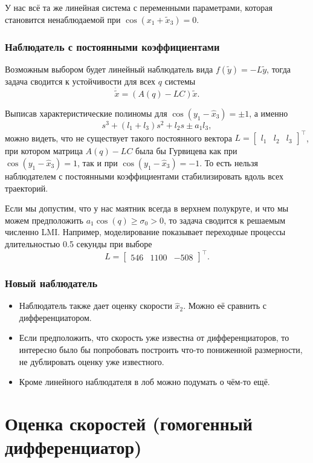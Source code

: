 \documentclass{article}
\begin{document}
У нас всё та же линейная система с переменными параметрами, которая становится ненаблюдаемой при $\cos(x_1+\tilde{x}_3) = 0$.

\subsubsection{Наблюдатель с постоянными коэффициентами}
Возможным выбором будет линейный наблюдатель вида $f(\tilde{y}) = -L\tilde{y}$, тогда задача сводится к устойчивости для всех $q$ системы 
\[
	\dot{\tilde{x}} = \left(A(q)-LC\right)\tilde{x}.
\]

Выписав характеристические полиномы для $\cos(y_1-\hat{x}_3)=\pm 1$,  а именно
\[
	s^3 + (l_1+l_3)s^2+l_2s \pm a_1l_3,
\]
можно видеть, что не существует такого постоянного вектора $L=\begin{bmatrix}l_1 & l_2 & l_3\end{bmatrix}^\top$, при котором матрица $A(q)-LC$ была бы Гурвицева как при $\cos(y_1-\hat{x}_3)=1$, так и при $\cos(y_1-\hat{x}_3)=-1$. То есть нельзя наблюдателем с постоянными коэффициентами стабилизировать вдоль всех траекторий. 


Если мы допустим, что у нас маятник всегда в верхнем полукруге, и что мы можем предположить $a_1\cos(q)\ge\sigma_0>0$, то задача сводится к решаемым численно LMI. Например, моделирование показывает переходные процессы длительностью 0.5 секунды при выборе 
\[
	L=\begin{bmatrix}546 & 1100 & -508\end{bmatrix}^\top.
\]

\subsubsection{Новый наблюдатель}


\begin{itemize}
\item Наблюдатель также дает оценку скорости $\hat{x}_2$. Можно её сравнить с дифференциатором.
\item Если предположить, что скорость уже известна от дифференциаторов, то интересно было бы попробовать построить что-то пониженной размерности, не дублировать оценку уже известного. 
\item Кроме линейного наблюдателя в лоб можно подумать о чём-то ещё.
\end{itemize}


\section{Оценка скоростей (гомогенный дифференциатор)}
\end{document}
